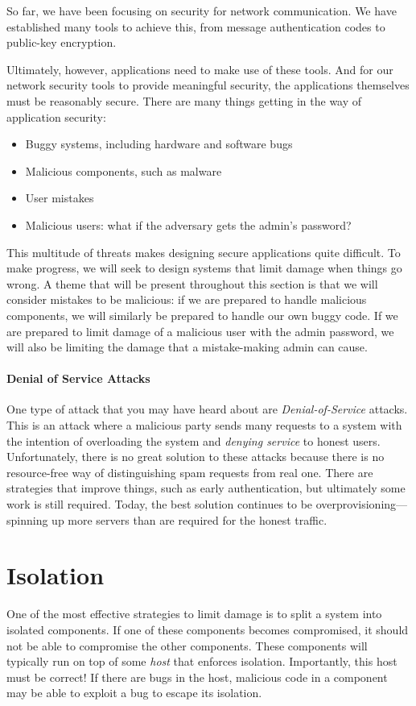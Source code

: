 So far, we have been focusing on security for network communication. We have established many tools to achieve this, from message authentication codes to public-key encryption.

Ultimately, however, applications need to make use of these tools. And for our network security tools to provide meaningful security, the applications themselves must be reasonably secure. There are many things getting in the way of application security:
\begin{itemize}
	\item Buggy systems, including hardware and software bugs
	\item Malicious components, such as malware
	\item User mistakes
	\item Malicious users: what if the adversary gets the admin's password?
\end{itemize}
This multitude of threats makes designing secure applications quite difficult. To make progress, we will seek to design systems that limit damage when things go wrong. A theme that will be present throughout this section is that we will consider mistakes to be malicious: if we are prepared to handle malicious components, we will similarly be prepared to handle our own buggy code. If we are prepared to limit damage of a malicious user with the admin password, we will also be limiting the damage that a mistake-making admin can cause.

\paragraph{Denial of Service Attacks}
One type of attack that you may have heard about are \emph{Denial-of-Service} attacks. This is an attack where a malicious party sends many requests to a system with the intention of overloading the system and \emph{denying service} to honest users. Unfortunately, there is no great solution to these attacks because there is no resource-free way of distinguishing spam requests from real one. There are strategies that improve things, such as early authentication, but ultimately some work is still required. Today, the best solution continues to be overprovisioning---spinning up more servers than are required for the honest traffic.

\section{Isolation}
One of the most effective strategies to limit damage is to split a system into isolated components. If one of these components becomes compromised, it should not be able to compromise the other components. These components will typically run on top of some \emph{host} that enforces isolation. Importantly, this host must be correct! If there are bugs in the host, malicious code in a component may be able to exploit a bug to escape its isolation.

